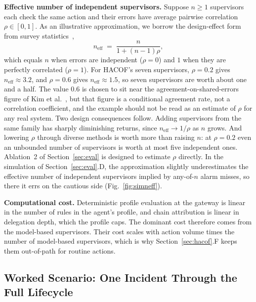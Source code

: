 \documentclass{ieeeaccess}
\newcommand{\hacof}{HACOF}
\begin{document}
\textbf{Effective number of independent supervisors.} Suppose $n \ge 1$ supervisors each check the same action and their errors have average pairwise correlation $\rho \in [0,1]$. As an illustrative approximation, we borrow the design-effect form from survey statistics~\cite{kish1965survey},
\begin{equation}
n_{\text{eff}} \;=\; \frac{n}{1 + (n-1)\rho},
\label{eq:neff}
\end{equation}
which equals $n$ when errors are independent ($\rho = 0$) and $1$ when they are perfectly correlated ($\rho = 1$). For \hacof's seven supervisors, $\rho = 0.2$ gives $n_{\text{eff}} \approx 3.2$, and $\rho = 0.6$ gives $n_{\text{eff}} \approx 1.5$, so seven supervisors are worth about one and a half. The value $0.6$ is chosen to sit near the agreement-on-shared-errors figure of Kim et al.~\cite{kim2025correlated}, but that figure is a conditional agreement rate, not a correlation coefficient, and the example should not be read as an estimate of $\rho$ for any real system.
Two design consequences follow. Adding supervisors from the same family has sharply diminishing returns, since $n_{\text{eff}} \to 1/\rho$ as $n$ grows. And lowering $\rho$ through diverse methods is worth more than raising $n$: at $\rho = 0.2$ even an unbounded number of supervisors is worth at most five independent ones. Ablation~2 of Section~\ref{sec:eval} is designed to estimate $\rho$ directly. In the simulation of Section~\ref{sec:eval}.D, the approximation slightly underestimates the effective number of independent supervisors implied by any-of-$n$ alarm misses, so there it errs on the cautious side (Fig.~\ref{fig:simneff}).

\textbf{Computational cost.} Deterministic profile evaluation at the gateway is linear in the number of rules in the agent's profile, and chain attribution is linear in delegation depth, which the profile caps. The dominant cost therefore comes from the model-based supervisors. Their cost scales with action volume times the number of model-based supervisors, which is why Section~\ref{sec:hacof}.F keeps them out-of-path for routine actions.

\subsection{Worked Scenario: One Incident Through the Full Lifecycle}
\label{sec:hacof-scenario}
\end{document}
